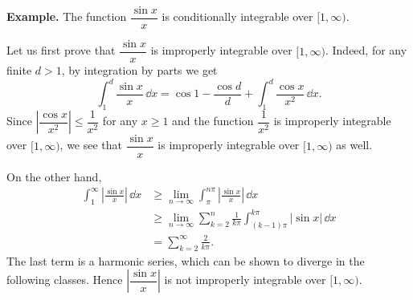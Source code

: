 \noindent\textbf{Example.} The function $\dfrac{\sin x}{x}$ is conditionally integrable over $[1,\infty)$.

Let us first prove that $\dfrac{\sin x}{x}$ is improperly integrable over $[1,\infty)$.  Indeed, for any finite $d > 1$, by integration by parts we get
\[
  \int_1^d \frac{\sin x}{x} \, \dd x = \cos 1 - \frac{\cos d}{d} + \int_1^d \frac{\cos x}{x^2} \, \dd x.
\]
Since $\left| \dfrac{\cos x}{x^2} \right| \leqslant \dfrac{1}{x^2}$ for any $x \geqslant 1$ and the function $\dfrac{1}{x^2}$ is improperly integrable over $[1,\infty)$, we see that $\dfrac{\sin x}{x}$ is improperly integrable over $[1,\infty)$ as well.

On the other hand, 
\begin{align*}
  \int_1^\infty \left| \frac{\sin x}{x} \right| \, \dd x &\geqslant \lim_{n \to \infty} \int_\pi^{n\pi} \left| \frac{\sin x}{x} \right| \, \dd x \\
  &\geqslant \lim_{n \to \infty} \sum_{k=2}^n \frac{1}{k\pi} \int_{(k-1)\pi}^{k\pi} |\sin x| \, \dd x \\
  &= \sum_{k=2}^\infty \frac{ 2 }{ k \pi }.
\end{align*}
The last term is a harmonic series, which can be shown to diverge in the following classes.
Hence $\left| \dfrac{\sin x}{x} \right|$ is not improperly integrable over $[1,\infty)$.

